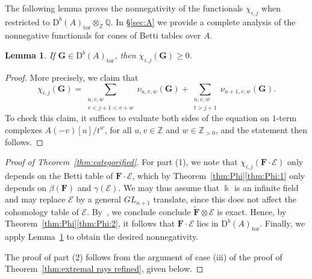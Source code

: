 \documentclass[12pt]{amsart}
\newtheorem{lemma}{Lemma}[section]
\theoremstyle{definition}
\theoremstyle{remark}
\newcommand{\kk}{\Bbbk}
\newcommand{\ZZ}{\mathbb{Z}}
\newcommand{\QQ}{\mathbb{Q}}
\newcommand{\cE}{\mathcal{E}}
\newcommand{\FF}{\mathbf{F}}
\newcommand{\Gbull}{\mathbf{G}}
\newcommand{\GL}{{GL}}
\newcommand{\DD}{\mathrm{D}}
\newcommand{\daniel}[1]{{\color{green} \sf $\clubsuit\clubsuit\clubsuit$ Daniel: [#1]}}
\begin{document}
The following lemma proves the nonnegativity of the functionals $\chi_{i,j}$ when restricted to $\DD^b(A)_{\text{tor}}\otimes_{\ZZ} \QQ$.  In \S\ref{sec:A} we provide a  complete analysis of the nonnegative functionals for cones of Betti tables over $A$.

\begin{lemma}\label{lem:chi nonneg}
If $\Gbull\in \DD^b(A)_{\text{tor}}$, then $\chi_{i,j}(\Gbull)\geq 0$.
\end{lemma}
\begin{proof}
%
More precisely, we claim that
\[
\chi_{i,j}(\Gbull)=\sum_{\substack{u,v,w \\ v< j+1<v+w}} \nu_{u,v,w}(\Gbull) + \sum_{\substack{u,v,w\\ t> j+1}} \nu_{u+1,v,w}(\Gbull).
\]
To check this claim, it suffices to evaluate both sides of the equation on $1$-term complexes $A(-v)[u]/t^w$, for all $u,v\in \ZZ$ and $w\in \ZZ_{>0}$, and the statement then follows.
\end{proof}

\begin{proof}[Proof of Theorem~\ref{thm:categorified}]
For part (1), we note that $\chi_{i,j}(\FF\cdot \cE)$ only depends on the Betti table of $\FF\cdot \cE$, which by Theorem~\ref{thm:Phi}\eqref{thm:Phi:1} only depends on $\beta(\FF)$ and $\gamma(\cE)$.  We may thus assume that $\kk$ is an infinite field and may replace $\cE$ by a general $\GL_{n+1}$ translate, since this does not affect the cohomology table of $\cE$.  By~\cite[Theorem]{miller-speyer}, we conclude conclude $\widetilde{\FF}\otimes \cE$ is exact.  Hence, by Theorem~\ref{thm:Phi}\eqref{thm:Phi:2}, it follows that $\FF\cdot \cE$ lies in $\DD^b(A)_{\text{tor}}$.  Finally, we apply Lemma~\ref{lem:chi nonneg} to obtain the desired nonnegativity.


The proof of part (2) follows from the argument of case (iii) of the proof of Theorem~\ref{thm:extremal rays refined}, given below.  
\end{proof}
\end{document}
